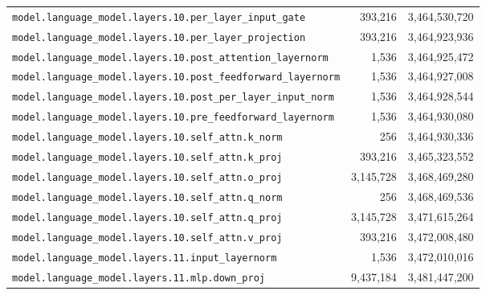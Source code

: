 \documentclass[10pt,a4paper]{article}
\theoremstyle{definition}
\begin{document}
\begin{appendices}
\begin{longtable}{p{9.5cm}rr}
\texttt{model.\allowbreak{}language\_model.\allowbreak{}layers.\allowbreak{}10.\allowbreak{}per\_layer\_input\_gate} & 393,216 & 3,464,530,720 \\
\texttt{model.\allowbreak{}language\_model.\allowbreak{}layers.\allowbreak{}10.\allowbreak{}per\_layer\_projection} & 393,216 & 3,464,923,936 \\
\texttt{model.\allowbreak{}language\_model.\allowbreak{}layers.\allowbreak{}10.\allowbreak{}post\_attention\_layernorm} & 1,536 & 3,464,925,472 \\
\texttt{model.\allowbreak{}language\_model.\allowbreak{}layers.\allowbreak{}10.\allowbreak{}post\_feedforward\_layernorm} & 1,536 & 3,464,927,008 \\
\texttt{model.\allowbreak{}language\_model.\allowbreak{}layers.\allowbreak{}10.\allowbreak{}post\_per\_layer\_input\_norm} & 1,536 & 3,464,928,544 \\
\texttt{model.\allowbreak{}language\_model.\allowbreak{}layers.\allowbreak{}10.\allowbreak{}pre\_feedforward\_layernorm} & 1,536 & 3,464,930,080 \\
\texttt{model.\allowbreak{}language\_model.\allowbreak{}layers.\allowbreak{}10.\allowbreak{}self\_attn.\allowbreak{}k\_norm} & 256 & 3,464,930,336 \\
\texttt{model.\allowbreak{}language\_model.\allowbreak{}layers.\allowbreak{}10.\allowbreak{}self\_attn.\allowbreak{}k\_proj} & 393,216 & 3,465,323,552 \\
\texttt{model.\allowbreak{}language\_model.\allowbreak{}layers.\allowbreak{}10.\allowbreak{}self\_attn.\allowbreak{}o\_proj} & 3,145,728 & 3,468,469,280 \\
\texttt{model.\allowbreak{}language\_model.\allowbreak{}layers.\allowbreak{}10.\allowbreak{}self\_attn.\allowbreak{}q\_norm} & 256 & 3,468,469,536 \\
\texttt{model.\allowbreak{}language\_model.\allowbreak{}layers.\allowbreak{}10.\allowbreak{}self\_attn.\allowbreak{}q\_proj} & 3,145,728 & 3,471,615,264 \\
\texttt{model.\allowbreak{}language\_model.\allowbreak{}layers.\allowbreak{}10.\allowbreak{}self\_attn.\allowbreak{}v\_proj} & 393,216 & 3,472,008,480 \\
\texttt{model.\allowbreak{}language\_model.\allowbreak{}layers.\allowbreak{}11.\allowbreak{}input\_layernorm} & 1,536 & 3,472,010,016 \\
\texttt{model.\allowbreak{}language\_model.\allowbreak{}layers.\allowbreak{}11.\allowbreak{}mlp.\allowbreak{}down\_proj} & 9,437,184 & 3,481,447,200 \\

\end{longtable}
\end{appendices}
\end{document}
